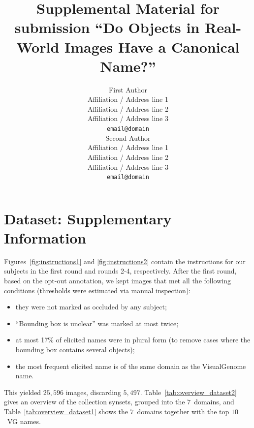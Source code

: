 \documentclass[11pt,a4paper]{article}
\title{Supplemental Material for submission ``Do Objects in Real-World Images Have a Canonical Name?''}
\author{First Author \\
  Affiliation / Address line 1 \\
  Affiliation / Address line 2 \\
  Affiliation / Address line 3 \\
  {\tt email@domain} \\\And
  Second Author \\
  Affiliation / Address line 1 \\
  Affiliation / Address line 2 \\
  Affiliation / Address line 3 \\
  {\tt email@domain} \\}
\date{}
\newcommand{\vgenome}{VisualGenome\xspace}
\begin{document}
\maketitle
\section{Dataset: Supplementary Information}
\label{app:instructions}

Figures~\ref{fig:instructions1} and \ref{fig:instructions2} contain the instructions for our subjects in the first round and rounds 2-4, respectively.
After the first round, based on the opt-out annotation, we kept images that met all the following conditions (thresholds were estimated via manual inspection):
\begin{itemize}
\item they were not marked as occluded by any subject;
\item ``Bounding box is unclear'' was marked at most twice;
\item at most 17\% of elicited names were in plural form (to remove cases where the bounding box contains several objects);
\item the most frequent elicited name is of the same domain as the \vgenome name.
\end{itemize}
This yielded $25,596$ images, discarding $5,497$.
Table~\ref{tab:overview_dataset2} gives an overview of the collection synsets, grouped into the $7$~domains, and Table~\ref{tab:overview_dataset1} shows the $7$\ domains together with the top $10$\ VG names.
\iffalse
\end{document}
